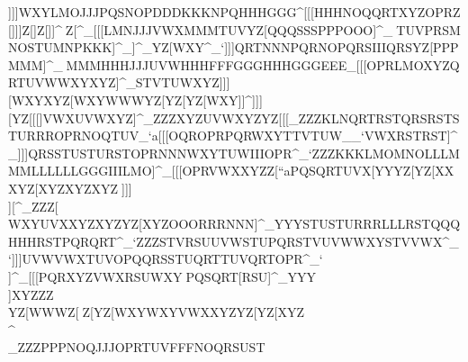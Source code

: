                          ]]]WXYLMOJJJPQSNOPDDDKKKNPQHHHGGG\]^                                                            [[[HHHNOQQRTXYZOPRZ[\WXYUVXWXZSTVZ[\                                                            ^^^^^_XYZXYZXYZXYZWWWXYZXYZYZ[XYZ\\]                                                            ]]]Z[\XYZXYZXYZYZ[WXYZ[\\]]Z[\XYZ]]^                                                            ^^^Z[\VWXWXY[[\WXYXYZVWXTUV[\]VXY]^_                                                            [[[LMNJJJVWXMMMTUVYZ[QQQSSSPPPOOO]^_                                                            ^^^TUVPRSMNOSTUMNPKKK]^_]^_YZ[WXY^_`                                                            ]]]QRTNNNPQRNOPQRSIIIQRSYZ[PPPMMM]^_                                                            ^^^MMMHHHJJJUVWHHHFFFGGGHHHGGGEEE\]_                                                            [[[OPRLMOXYZQRTUVWWXYXYZ]^_STVTUWXYZ                                                            ]]][\]WXYXYZ[\]WXYWWWYZ[YZ[YZ[WXY]]^                                                            ]]][\]YZ[[[\Z[\YZ[ZZ\\]]VWXUVWXYZ]^_                                                            ZZZXYZUVWXYZYZ[[[\VWXWXYYYZUUUZ[\\]_                                                            ZZZKLNQRTRSTQRSRSTSTURRROPRNOQTUV_`a                                                            [[[OQROPRPQRWXYTTVTUW__`VWXRSTRST]^_                                                            ]]]QRSSTUSTURSTOPRNNNWXYTUWIIIOPR^_`                                                            ZZZKKKLMOMNOLLLMMMLLLLLLGGGIIILMO]^_                                                            [[[OPRVWXXYZZ[\WXYVWX``aPQSQRTUVX[\]                                                            YYYZ[\YZ[[\]\\]YZ[XXXYZ[XYZXYZXYZ^^_                                                            ]]]\\][\][\]XYZYZ[ZZ[VWXWXYWXYXYZ]^_                                                            ZZZ[\\WXYUVXXYZXYZYZ[XYZOOORRRNNN]^_                                                            YYYSTUSTURRRLLLRSTQQQHHHRSTPQRQRT^_`                                                            ZZZSTVRSUUVWSTUPQRSTVUVWWXYSTVVWX^_`                                                            ]]]UVWVWXTUVOPQQRSSTUQRTTUVQRTOPR^_`                                                            \\\QRSJJJFFFLLLPQRQRSMNPNOQLLLIII]^_                                                            [[[PQRXYZVWXRSUWXY^^_PQSQRT[\]RSU]^_                                                            YYY\\]XYZZZ\[\]YZ[WWWZ[\YZ[YZ[XYZ_``                                                            ___]^^YZ[YZ[WXYWXYVWXXYZYZ[YZ[XYZ\\^                                                            \\\ZZ\UVWWXYXYZUVWWXYSSSRRROOOPPP\]_                                                            ZZZPPPNOQJJJOPRTUVFFFNOQRSUST